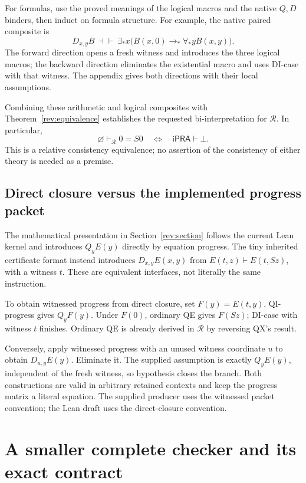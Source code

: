 \documentclass[11pt,letterpaper]{article}
\theoremstyle{definition}\newtheorem{definition}[theorem]{Definition}
\theoremstyle{remark}\newtheorem{remark}[theorem]{Remark}
\newcommand{\ipra}{\mathsf{iPRA}}
\newcommand{\Rcal}{\mathcal R}
\begin{document}
For formulas, use the proved meanings of the logical macros and the
native $Q,D$ binders, then induct on formula structure. For example,
the native paired composite is
\[
 D_{x,y}B\ \dashv\vdash\
 \exists_*x\bigl(B(x,0)\to_*\forall_*y B(x,y)\bigr).
\]
The forward direction opens a fresh witness and introduces the three
logical macros; the backward direction eliminates the existential
macro and uses DI-case with that witness. The appendix gives both
directions with their local assumptions.

Combining these arithmetic and logical composites with
Theorem~\ref{rev:equivalence} establishes the requested bi-interpretation
for $\Rcal$. In particular,
\[
 \varnothing\vdash_{\Rcal}0=S0
 \quad\Longleftrightarrow\quad
 \ipra\vdash\bot.
\]
This is a relative consistency equivalence; no assertion of the
consistency of either theory is needed as a premise.

\subsection{Direct closure versus the implemented progress packet}
\label{sec:progress-packet}

The mathematical presentation in Section~\ref{rev:section} follows the
current Lean kernel and introduces $Q_yE(y)$ directly by equation
progress. The tiny inherited certificate format instead introduces
$D_{x,y}E(x,y)$ from $E(t,z)\vdash E(t,Sz)$, with a witness $t$.
These are equivalent interfaces, not literally the same instruction.

To obtain witnessed progress from direct closure, set $F(y)=E(t,y)$.
QI-progress gives $Q_yF(y)$. Under $F(0)$, ordinary QE gives $F(Sz)$;
DI-case with witness $t$ finishes. Ordinary QE is already derived in
$\Rcal$ by reversing QX's result.

Conversely, apply witnessed progress with an unused witness coordinate
$u$ to obtain $D_{u,y}E(y)$. Eliminate it. The supplied assumption is
exactly $Q_yE(y)$, independent of the fresh witness, so hypothesis
closes the branch. Both constructions are valid in arbitrary retained
contexts and keep the progress matrix a literal equation. The supplied
producer uses the witnessed packet convention; the Lean draft uses the
direct-closure convention.

\section{A smaller complete checker and its exact contract}
\label{sec:checker}
\end{document}
